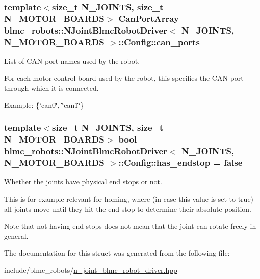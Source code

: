 \subsubsection[{\texorpdfstring{can\+\_\+ports}{can_ports}}]{\setlength{\rightskip}{0pt plus 5cm}template$<$size\+\_\+t N\+\_\+\+J\+O\+I\+N\+TS, size\+\_\+t N\+\_\+\+M\+O\+T\+O\+R\+\_\+\+B\+O\+A\+R\+DS$>$ Can\+Port\+Array {\bf blmc\+\_\+robots\+::\+N\+Joint\+Blmc\+Robot\+Driver}$<$ N\+\_\+\+J\+O\+I\+N\+TS, N\+\_\+\+M\+O\+T\+O\+R\+\_\+\+B\+O\+A\+R\+DS $>$\+::Config\+::can\+\_\+ports}\hypertarget{structblmc__robots_1_1NJointBlmcRobotDriver_1_1Config_a849381580e6d6d0768e6a4e04a394cfd}{}\label{structblmc__robots_1_1NJointBlmcRobotDriver_1_1Config_a849381580e6d6d0768e6a4e04a394cfd}


List of C\+AN port names used by the robot. 

For each motor control board used by the robot, this specifies the C\+AN port through which it is connected.

Example\+: {\ttfamily \{\char`\"{}can0\char`\"{}, \char`\"{}can1\char`\"{}\}} 
\subsubsection[{\texorpdfstring{has\+\_\+endstop}{has_endstop}}]{\setlength{\rightskip}{0pt plus 5cm}template$<$size\+\_\+t N\+\_\+\+J\+O\+I\+N\+TS, size\+\_\+t N\+\_\+\+M\+O\+T\+O\+R\+\_\+\+B\+O\+A\+R\+DS$>$ bool {\bf blmc\+\_\+robots\+::\+N\+Joint\+Blmc\+Robot\+Driver}$<$ N\+\_\+\+J\+O\+I\+N\+TS, N\+\_\+\+M\+O\+T\+O\+R\+\_\+\+B\+O\+A\+R\+DS $>$\+::Config\+::has\+\_\+endstop = false}\hypertarget{structblmc__robots_1_1NJointBlmcRobotDriver_1_1Config_a8cbf3c740b0cae7afb7170d51e04b60d}{}\label{structblmc__robots_1_1NJointBlmcRobotDriver_1_1Config_a8cbf3c740b0cae7afb7170d51e04b60d}


Whether the joints have physical end stops or not. 

This is for example relevant for homing, where (in case this value is set to true) all joints move until they hit the end stop to determine their absolute position.

Note that not having end stops does not mean that the joint can rotate freely in general. 

The documentation for this struct was generated from the following file\+:\begin{DoxyCompactItemize}
\item 
include/blmc\+\_\+robots/\hyperlink{n__joint__blmc__robot__driver_8hpp}{n\+\_\+joint\+\_\+blmc\+\_\+robot\+\_\+driver.\+hpp}\end{DoxyCompactItemize}
